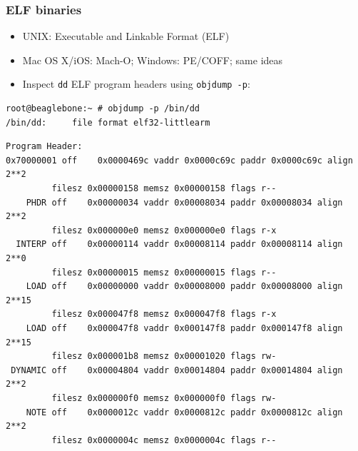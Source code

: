 \begin{frame}[fragile]
  \frametitle{ELF binaries}

  \pause

  \begin{itemize}
    \item UNIX: Executable and Linkable Format (ELF)
    \item Mac OS X/iOS: Mach-O; Windows: PE/COFF; same ideas
    \item Inspect \texttt{dd} ELF program headers using \texttt{objdump -p}:
  \end{itemize}

  \pause

  \begin{scriptsize}
\begin{verbatim}
root@beaglebone:~ # objdump -p /bin/dd
/bin/dd:     file format elf32-littlearm
\end{verbatim}
  \end{scriptsize}

  \pause

  \begin{scriptsize}
\begin{verbatim}
Program Header:
0x70000001 off    0x0000469c vaddr 0x0000c69c paddr 0x0000c69c align 2**2
         filesz 0x00000158 memsz 0x00000158 flags r--
    PHDR off    0x00000034 vaddr 0x00008034 paddr 0x00008034 align 2**2
         filesz 0x000000e0 memsz 0x000000e0 flags r-x
  INTERP off    0x00000114 vaddr 0x00008114 paddr 0x00008114 align 2**0
         filesz 0x00000015 memsz 0x00000015 flags r--
    LOAD off    0x00000000 vaddr 0x00008000 paddr 0x00008000 align 2**15
         filesz 0x000047f8 memsz 0x000047f8 flags r-x
    LOAD off    0x000047f8 vaddr 0x000147f8 paddr 0x000147f8 align 2**15
         filesz 0x000001b8 memsz 0x00001020 flags rw-
 DYNAMIC off    0x00004804 vaddr 0x00014804 paddr 0x00014804 align 2**2
         filesz 0x000000f0 memsz 0x000000f0 flags rw-
    NOTE off    0x0000012c vaddr 0x0000812c paddr 0x0000812c align 2**2
         filesz 0x0000004c memsz 0x0000004c flags r--
\end{verbatim}
  \end{scriptsize}
\end{frame}

